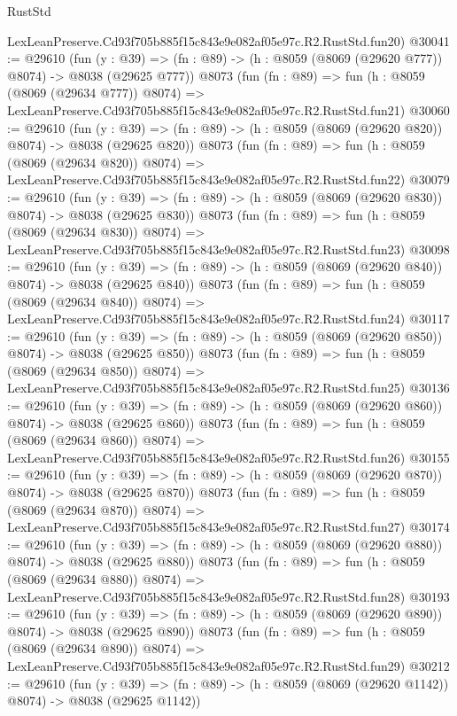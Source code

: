 \begin{lexlean}{RustStd}
\begin{coremodule}
    LexLeanPreserve.Cd93f705b885f15c843e9e082af05e97c.R2.RustStd.fun20)
@30041 := @29610
    (fun (y : @39) => (fn : @89) -> (h : @8059 (@8069 (@29620 @777)) @8074) -> @8038 (@29625 @777))
    @8073
    (fun (fn : @89) =>
    fun (h : @8059 (@8069 (@29634 @777)) @8074) =>
    LexLeanPreserve.Cd93f705b885f15c843e9e082af05e97c.R2.RustStd.fun21)
@30060 := @29610
    (fun (y : @39) => (fn : @89) -> (h : @8059 (@8069 (@29620 @820)) @8074) -> @8038 (@29625 @820))
    @8073
    (fun (fn : @89) =>
    fun (h : @8059 (@8069 (@29634 @820)) @8074) =>
    LexLeanPreserve.Cd93f705b885f15c843e9e082af05e97c.R2.RustStd.fun22)
@30079 := @29610
    (fun (y : @39) => (fn : @89) -> (h : @8059 (@8069 (@29620 @830)) @8074) -> @8038 (@29625 @830))
    @8073
    (fun (fn : @89) =>
    fun (h : @8059 (@8069 (@29634 @830)) @8074) =>
    LexLeanPreserve.Cd93f705b885f15c843e9e082af05e97c.R2.RustStd.fun23)
@30098 := @29610
    (fun (y : @39) => (fn : @89) -> (h : @8059 (@8069 (@29620 @840)) @8074) -> @8038 (@29625 @840))
    @8073
    (fun (fn : @89) =>
    fun (h : @8059 (@8069 (@29634 @840)) @8074) =>
    LexLeanPreserve.Cd93f705b885f15c843e9e082af05e97c.R2.RustStd.fun24)
@30117 := @29610
    (fun (y : @39) => (fn : @89) -> (h : @8059 (@8069 (@29620 @850)) @8074) -> @8038 (@29625 @850))
    @8073
    (fun (fn : @89) =>
    fun (h : @8059 (@8069 (@29634 @850)) @8074) =>
    LexLeanPreserve.Cd93f705b885f15c843e9e082af05e97c.R2.RustStd.fun25)
@30136 := @29610
    (fun (y : @39) => (fn : @89) -> (h : @8059 (@8069 (@29620 @860)) @8074) -> @8038 (@29625 @860))
    @8073
    (fun (fn : @89) =>
    fun (h : @8059 (@8069 (@29634 @860)) @8074) =>
    LexLeanPreserve.Cd93f705b885f15c843e9e082af05e97c.R2.RustStd.fun26)
@30155 := @29610
    (fun (y : @39) => (fn : @89) -> (h : @8059 (@8069 (@29620 @870)) @8074) -> @8038 (@29625 @870))
    @8073
    (fun (fn : @89) =>
    fun (h : @8059 (@8069 (@29634 @870)) @8074) =>
    LexLeanPreserve.Cd93f705b885f15c843e9e082af05e97c.R2.RustStd.fun27)
@30174 := @29610
    (fun (y : @39) => (fn : @89) -> (h : @8059 (@8069 (@29620 @880)) @8074) -> @8038 (@29625 @880))
    @8073
    (fun (fn : @89) =>
    fun (h : @8059 (@8069 (@29634 @880)) @8074) =>
    LexLeanPreserve.Cd93f705b885f15c843e9e082af05e97c.R2.RustStd.fun28)
@30193 := @29610
    (fun (y : @39) => (fn : @89) -> (h : @8059 (@8069 (@29620 @890)) @8074) -> @8038 (@29625 @890))
    @8073
    (fun (fn : @89) =>
    fun (h : @8059 (@8069 (@29634 @890)) @8074) =>
    LexLeanPreserve.Cd93f705b885f15c843e9e082af05e97c.R2.RustStd.fun29)
@30212 := @29610
    (fun (y : @39) =>
    (fn : @89) -> (h : @8059 (@8069 (@29620 @1142)) @8074) -> @8038 (@29625 @1142))

\end{coremodule}
\end{lexlean}
